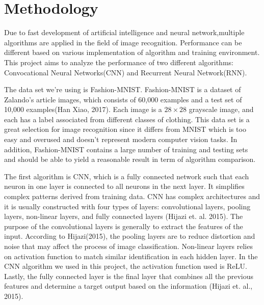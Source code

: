 \documentclass[letterpaper]{article} %
\begin{document}
\section{Methodology}

Due to fast development of artificial intelligence and neural network,multiple algorithms are applied in the field of image recognition. Performance can be different based on various implementation of algorithm and training environment. This project aims to analyze the performance of two different algorithms: Convocational Neural Networks(CNN) and Recurrent Neural Network(RNN).

The data set we're using is Fashion-MNIST. Fashion-MNIST is a dataset of Zalando's article images, which consists of 60,000 examples and a test set of 10,000 examples(Han Xiao, 2017). Each image is a $28 \times 28$ grayscale image, and each has a label associated from different classes of clothing. This data set is a great selection for image recognition since it differs from MNIST which is too easy and overused and doesn't represent modern computer vision tasks. In addition, Fashion-MNIST contains a large number of training and testing sets and should be able to yield a reasonable result in term of algorithm comparison.

The first algorithm is CNN, which is a fully connected network such that each neuron in one layer is connected to all neurons in the next layer. It simplifies complex patterns derived from training data. CNN has complex architectures and it is usually constructed with four types of layers: convolutional layers, pooling layers, non-linear layers, and fully connected layers (Hijazi et. al. 2015). The purpose of the convolutional layers is generally to extract the features of the input. According to Hijazi(2015), the pooling layers are to reduce distortion and noise that may affect the process of image classification. Non-linear layers relies on activation function to match similar identification in each hidden layer. In the CNN algorithm we used in this project, the activation function used is ReLU. Lastly, the fully connected layer is the final layer that combines all the previous features and determine a target output based on the information (Hijazi et. al., 2015). 
\end{document}

